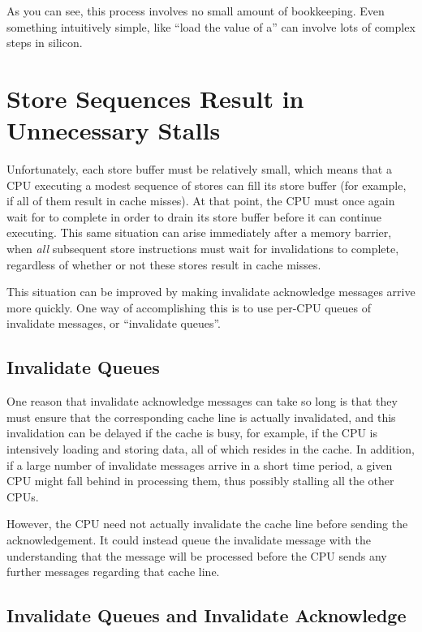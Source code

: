 As you can see, this process involves no small amount of bookkeeping.
Even something intuitively simple, like ``load the value of a'' can
involve lots of complex steps in silicon.

\section{Store Sequences Result in Unnecessary Stalls}
\label{sec:app:whymb:Store Sequences Result in Unnecessary Stalls}

Unfortunately, each store buffer must be relatively small, which means
that a CPU executing a modest sequence of stores can fill its store
buffer (for example, if all of them result in cache misses).
At that point, the CPU must once again wait for  to complete
in order to drain its store buffer before it can continue executing.
This same situation can arise immediately after a memory barrier, when
\emph{all} subsequent store instructions must wait for invalidations to
complete, regardless of whether or not these stores result in cache misses.

This situation can be improved by making invalidate acknowledge
messages arrive more quickly.
One way of accomplishing this is to use per-CPU queues of
invalidate messages, or ``invalidate queues''.

\subsection{Invalidate Queues}
\label{sec:app:whymb:Invalidate Queues}

One reason that invalidate acknowledge messages can take so long
is that they must ensure that the corresponding cache line is
actually invalidated, and this invalidation can be delayed if
the cache is busy, for example, if the CPU is intensively loading
and storing data, all of which resides in the cache.
In addition, if a large number of invalidate messages arrive
in a short time period, a given CPU might fall behind in processing
them, thus possibly stalling all the other CPUs.

However, the CPU need not actually invalidate the cache line
before sending the acknowledgement.
It could instead queue the invalidate message with the understanding
that the message will be processed before the CPU sends any further
messages regarding that cache line.

\subsection{Invalidate Queues and Invalidate Acknowledge}
\label{sec:app:whymb:Invalidate Queues and Invalidate Acknowledge}

